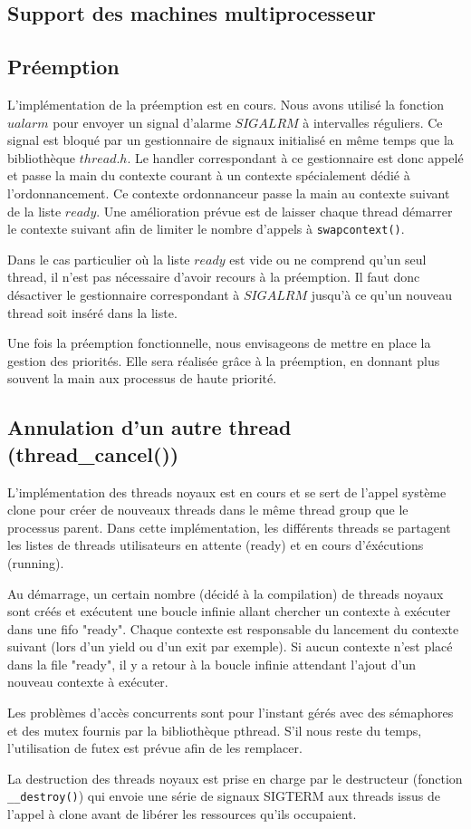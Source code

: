 \subsection{Support des machines multiprocesseur}




\subsection{Préemption} 

L'implémentation de la préemption est en cours. Nous avons utilisé la fonction
$ualarm$ pour envoyer un signal d'alarme $SIGALRM$ à intervalles réguliers. Ce
signal est bloqué par un gestionnaire de signaux initialisé en même temps que
la bibliothèque $thread.h$. Le handler correspondant à ce gestionnaire est donc
appelé et passe la main du contexte courant à un contexte spécialement dédié à
l'ordonnancement. Ce contexte ordonnanceur passe la main au contexte suivant de
la liste $ready$. Une amélioration prévue est de laisser chaque thread démarrer
le contexte suivant afin de limiter le nombre d'appels à \verb!swapcontext()!.

Dans le cas particulier où la liste $ready$ est vide ou ne comprend qu'un seul
thread, il n'est pas nécessaire d'avoir recours à la préemption. Il faut donc
désactiver le gestionnaire correspondant à $SIGALRM$ jusqu'à ce qu'un nouveau
thread soit inséré dans la liste.

Une fois la préemption fonctionnelle, nous envisageons de mettre en place la
gestion des priorités. Elle sera réalisée grâce à la préemption, en donnant
plus souvent la main aux processus de haute priorité.
 
\subsection{Annulation d'un autre thread (thread\_cancel())}
L'implémentation des threads noyaux est en cours et se sert de l'appel système clone pour créer de nouveaux threads dans le même thread group que le processus parent. Dans cette implémentation, les différents threads se partagent les listes de threads utilisateurs en attente (ready) et en cours d'éxécutions (running).

Au démarrage, un certain nombre (décidé à la compilation) de threads noyaux sont créés et exécutent une boucle infinie allant chercher un contexte à exécuter dans une fifo "ready". Chaque contexte est responsable du lancement du contexte suivant (lors d'un yield ou d'un exit par exemple). Si aucun contexte n'est placé dans la file "ready", il y a retour à la boucle infinie attendant l'ajout d'un nouveau contexte à exécuter.

Les problèmes d'accès concurrents sont pour l'instant gérés avec des sémaphores et des mutex fournis par la bibliothèque pthread. S'il nous reste du temps, l'utilisation de futex est prévue afin de les remplacer.

La destruction des threads noyaux est prise en charge par le destructeur (fonction \verb!__destroy()!) qui envoie une série de signaux SIGTERM aux threads issus de l'appel à clone avant de libérer les ressources qu'ils occupaient.
